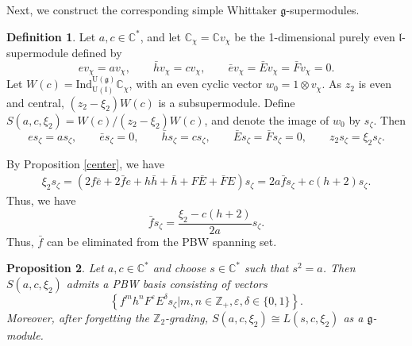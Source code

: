 \documentclass[a4paper,10pt]{article}
\theoremstyle{definition}
\newtheorem{definition}{Definition}[section]
\theoremstyle{plain}
\newtheorem{proposition}[definition]{Proposition}
\theoremstyle{remark}
\theoremstyle{mystyle}
\numberwithin{equation}{section}
\begin{document}
Next, we construct the corresponding simple Whittaker $\mathfrak g$-supermodules.
\begin{definition}
    Let $a,c\in \mathbb C^*$, and let $\mathbb C_{\chi}=\mathbb Cv_{\chi}$ be the 1-dimensional purely even \(\mathfrak l\)-supermodule defined by 
    \[
    ev_{\chi}=av_{\chi},\qquad\bar hv_{\chi}=cv_{\chi},\qquad \bar ev_{\chi}=\bar Ev_{\chi}=\bar Fv_{\chi}=0.
    \]
    Let $W(c)=\text{Ind}^{\mathrm U(\mathfrak g)}_{\mathrm U(\mathfrak l)}\mathbb C_\chi$, with an even cyclic vector \(w_0=1\otimes v_{\chi}\). As \(z_2\) is even and central, \((z_2-\xi_2)W(c)\) is a subsupermodule. Define $S(a,c,\xi_2)=W(c)/(z_2-\xi_2)W(c)$, and denote the image of \(w_0\) by $s_{\zeta}$. Then 
    $$
    es_{\zeta}=as_{\zeta},\qquad\bar es_{\zeta}=0,\qquad \bar hs_{\zeta}=cs_{\zeta},\qquad\bar Es_{\zeta }=\bar Fs_{\zeta}=0,\qquad z_2s_{\zeta }=\xi_2s_{\zeta }.
    $$
\end{definition}
    By Proposition \ref{center}, we have
    $$
    \begin{aligned}
        \xi_2s_{\zeta}=(2f\bar e+2\bar fe+h\bar h+\bar h+F\bar E+\bar FE)s_{\zeta}=2a\bar fs_{\zeta}+c(h+2)s_{\zeta}.
    \end{aligned}
    $$
    Thus, we have
    $$
    \bar fs_{\zeta}=\frac{\xi_2-c(h+2)}{2a}s_{\zeta}.
    $$
    Thus, \(\bar f\) can be eliminated from the PBW spanning set.
\begin{proposition}\label{LScong}
    Let \(a,c\in \mathbb C^*\) and choose $s\in \mathbb C^*$ such that $s^2=a$. Then $S(a,c,\xi_2)$ admits a PBW basis consisting of vectors
    $$
    \left\{f^mh^nF^\varepsilon E^\delta s_{\zeta}|m,n\in\mathbb{Z}_+,\varepsilon,\delta\in \{0,1\}\right\}.
    $$
Moreover, after forgetting the $\mathbb Z_2$-grading, $S(a,c,\xi_2)\cong L(s,c,\xi_2)$ as a \(\mathfrak g\)-module.
\end{proposition}
\end{document}

